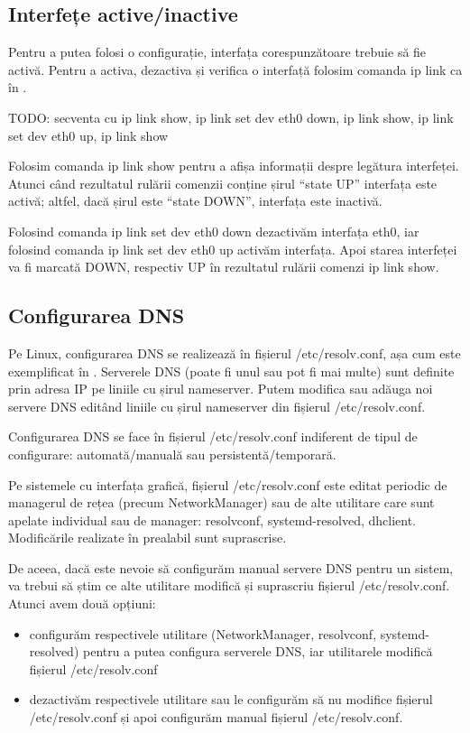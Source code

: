 \subsection{Interfețe active/inactive}
\label{sec:net:up-down-interfaces}

Pentru a putea folosi o configurație, interfața corespunzătoare trebuie să fie activă. Pentru a activa, dezactiva și verifica o interfață folosim comanda ip link ca în .

\begin{screen}[caption={Activarea și dezactivarea unei interfețe},label={lst:net:enable-if}]
TODO: secventa cu ip link show, ip link set dev eth0 down, ip link show, ip link set dev eth0 up, ip link show
\end{screen}

Folosim comanda ip link show pentru a afișa informații despre legătura interfeței. Atunci când rezultatul rulării comenzii conține șirul “state UP” interfața este activă; altfel, dacă șirul este “state DOWN”, interfața este inactivă.

Folosind comanda ip link set dev eth0 down dezactivăm interfața eth0, iar folosind comanda ip link set dev eth0 up activăm interfața. Apoi starea interfeței va fi marcată DOWN, respectiv UP în rezultatul rulării comenzi ip link show.

\subsection{Configurarea DNS}
\label{sec:net:config-dns}

Pe Linux, configurarea DNS se realizează în fișierul /etc/resolv.conf, așa cum este exemplificat în . Serverele DNS (poate fi unul sau pot fi mai multe) sunt definite prin adresa IP pe liniile cu șirul nameserver. Putem modifica sau adăuga noi servere DNS editând liniile cu șirul nameserver din fișierul /etc/resolv.conf.

Configurarea DNS se face în fișierul /etc/resolv.conf indiferent de tipul de configurare: automată/manuală sau persistentă/temporară.

Pe sistemele cu interfața grafică, fișierul /etc/resolv.conf este editat periodic de managerul de rețea (precum NetworkManager) sau de alte utilitare care sunt apelate individual sau de manager: resolvconf, systemd-resolved, dhclient. Modificările realizate în prealabil sunt suprascrise.

De aceea, dacă este nevoie să configurăm manual servere DNS pentru un sistem, va trebui să știm ce alte utilitare modifică și suprascriu fișierul /etc/resolv.conf. Atunci avem două opțiuni:
\begin{itemize}
  \item configurăm respectivele utilitare (NetworkManager, resolvconf, systemd-resolved) pentru a putea configura serverele DNS, iar utilitarele modifică fișierul /etc/resolv.conf
  \item dezactivăm respectivele utilitare sau le configurăm să nu modifice fișierul /etc/resolv.conf și apoi configurăm manual fișierul /etc/resolv.conf.
\end{itemize}

